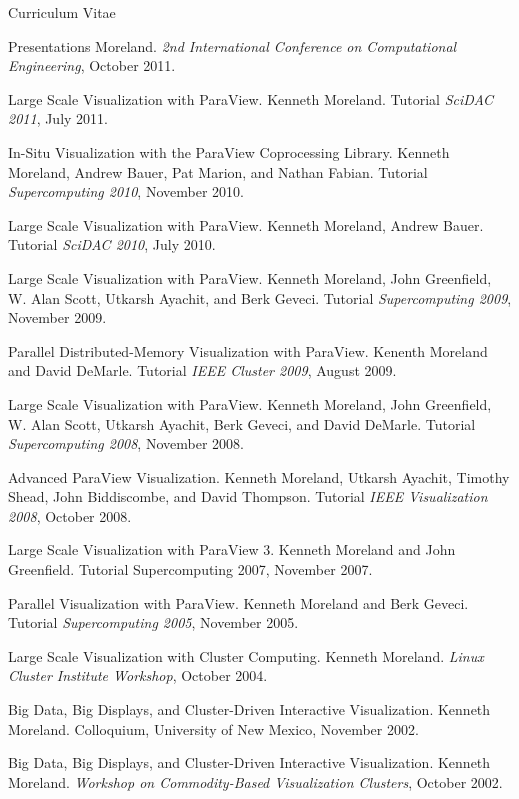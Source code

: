 \documentclass{article}
\begin{document}
\begin{cv}{Curriculum Vitae}
\begin{cvlist}{Presentations}
      Moreland. \emph{2nd International Conference on Computational
        Engineering}, October 2011.
    \item[Large Scale Visualization with ParaView.] Kenneth
      Moreland. Tutorial \emph{SciDAC 2011}, July 2011.
    \item[In-Situ Visualization with the ParaView Coprocessing Library.]
      Kenneth Moreland, Andrew Bauer, Pat Marion, and Nathan
      Fabian. Tutorial \emph{Supercomputing 2010}, November 2010.
    \item[Large Scale Visualization with ParaView.] Kenneth Moreland,
      Andrew Bauer. Tutorial \emph{SciDAC 2010}, July 2010.
    \item[Large Scale Visualization with ParaView.] Kenneth Moreland, John
      Greenfield, W. Alan Scott, Utkarsh Ayachit, and Berk Geveci. Tutorial
      \emph{Supercomputing 2009}, November 2009.
    \item[Parallel Distributed-Memory Visualization with ParaView.] Kenenth
      Moreland and David DeMarle. Tutorial \emph{IEEE Cluster 2009}, August
      2009.
    \item[Large Scale Visualization with ParaView.] Kenneth Moreland, John
      Greenfield, W. Alan Scott, Utkarsh Ayachit, Berk Geveci, and David
      DeMarle. Tutorial \emph{Supercomputing 2008}, November 2008.
    \item[Advanced ParaView Visualization.] Kenneth Moreland, Utkarsh
      Ayachit, Timothy Shead, John Biddiscombe, and David
      Thompson. Tutorial \emph{IEEE Visualization 2008}, October 2008.
    \item[Large Scale Visualization with ParaView 3.] Kenneth Moreland and
      John Greenfield. Tutorial Supercomputing 2007, November 2007.
    \item[Parallel Visualization with ParaView.] Kenneth Moreland and Berk
      Geveci. Tutorial \emph{Supercomputing 2005}, November 2005.
    \item[Large Scale Visualization with Cluster Computing.] Kenneth
      Moreland. \emph{Linux Cluster Institute Workshop}, October 2004.
    \item[Big Data, Big Displays, and Cluster-Driven Interactive
      Visualization.] Kenneth Moreland. Colloquium, University of New
      Mexico, November 2002.
    \item[Big Data, Big Displays, and Cluster-Driven Interactive
      Visualization.] Kenneth Moreland. \emph{Workshop on Commodity-Based
      Visualization Clusters}, October 2002.
    \end{cvlist}


\end{cv}
\end{document}
